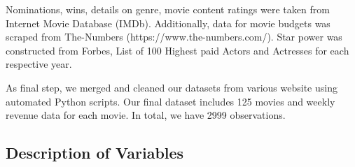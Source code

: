 \documentclass[11pt]{article} %
\begin{document}
Nominations, wins, details on genre, movie content ratings were taken from Internet Movie Database (IMDb). Additionally, data for movie budgets was scraped from The-Numbers (https://www.the-numbers.com/). Star power was constructed from Forbes, List of 100 Highest paid Actors and Actresses for each respective year. 

As final step, we merged and cleaned our datasets from various website using automated Python scripts. Our final dataset includes 125 movies and weekly revenue data for each movie. In total, we have 2999 observations. 

\subsection{Description of Variables}

\begin{table}[h]
\caption{Column names and definitions}
\end{table}
\end{document}
